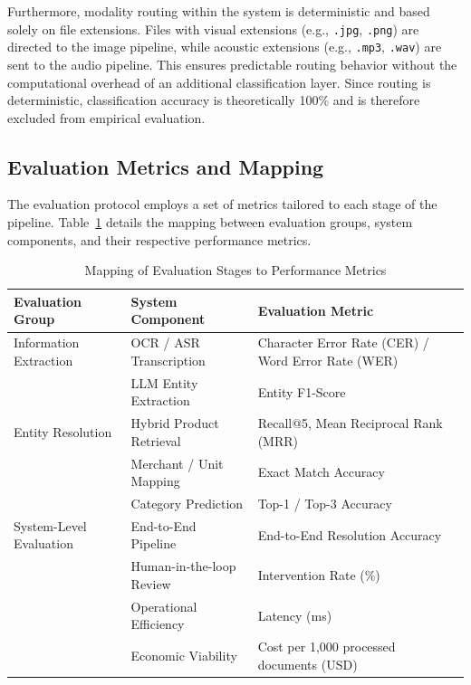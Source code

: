 Furthermore, modality routing within the system is deterministic and based solely on file extensions. Files with visual extensions (e.g., \texttt{.jpg}, \texttt{.png}) are directed to the image pipeline, while acoustic extensions (e.g., \texttt{.mp3}, \texttt{.wav}) are sent to the audio pipeline. This ensures predictable routing behavior without the computational overhead of an additional classification layer. Since routing is deterministic, classification accuracy is theoretically 100\% and is therefore excluded from empirical evaluation.

\subsection{Evaluation Metrics and Mapping}
The evaluation protocol employs a set of metrics tailored to each stage of the pipeline. Table~\ref{tab:eval_metrics} details the mapping between evaluation groups, system components, and their respective performance metrics.

\begin{table}[htbp]
    \centering
    \caption{Mapping of Evaluation Stages to Performance Metrics}
    \label{tab:eval_metrics}
    \renewcommand{\arraystretch}{1.2}
    \begin{tabular}{p{3.5cm} p{4.0cm} p{5.5cm}}
        \hline
        \textbf{Evaluation Group} & \textbf{System Component} & \textbf{Evaluation Metric} \\
        \hline
        Information Extraction
            & OCR / ASR Transcription
            & Character Error Rate (CER) / Word Error Rate (WER) \\
            & LLM Entity Extraction
            & Entity F1-Score \\
        \hline
        Entity Resolution
            & Hybrid Product Retrieval
            & Recall@5, Mean Reciprocal Rank (MRR) \\
            & Merchant / Unit Mapping
            & Exact Match Accuracy \\
            & Category Prediction
            & Top-1 / Top-3 Accuracy \\
        \hline
        System-Level Evaluation
            & End-to-End Pipeline
            & End-to-End Resolution Accuracy \\
            & Human-in-the-loop Review
            & Intervention Rate (\%) \\
            & Operational Efficiency
            & Latency (ms) \\
            & Economic Viability
            & Cost per 1,000 processed documents (USD) \\
        \hline
    \end{tabular}
\end{table}

